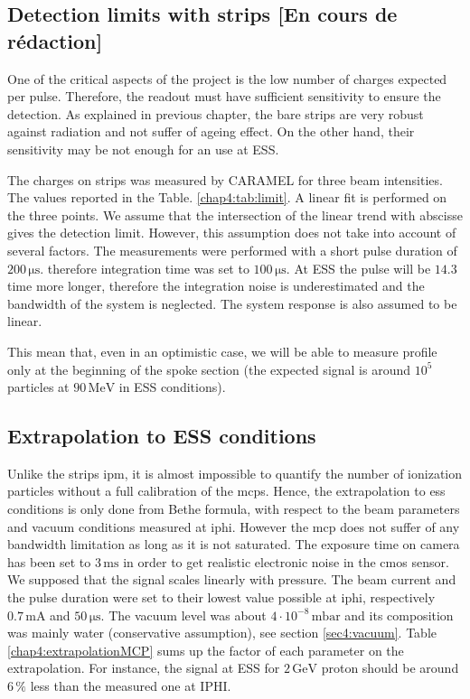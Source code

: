 \begin{refsection}
  \subsection{Detection limits with strips [En cours de rédaction]}
  One of the critical aspects of the project is the low number of charges expected per pulse. Therefore, the  readout must have sufficient sensitivity to ensure the detection. As explained in previous chapter, the bare strips are very robust against radiation and not suffer of ageing effect. On the other hand, their sensitivity may be not enough for an use at ESS.

  The charges on strips was measured by CARAMEL for three beam intensities. The values reported in the Table. \ref{chap4:tab:limit}. A linear fit is performed on the three points. We assume that the intersection of the linear trend with abscisse gives the detection limit. However, this assumption does not take into account of several factors. The measurements were performed with a short pulse duration of $200\,\mathrm{\mu s}$. therefore integration time was set to $100\,\mathrm{\mu s}$. At ESS the pulse will be $14.3$ time more longer, therefore the integration noise is underestimated and the bandwidth of the system is neglected. The system response is also assumed to be linear.

  


  
  This mean that, even in an optimistic case, we will be able to measure profile only at the beginning of the spoke section (the expected signal is around $10^{5}$ particles at $90\,\mathrm{MeV}$ in ESS conditions).

  \subsection{Extrapolation to ESS conditions}
  \label{chap4:sec:MCPess}
  Unlike the strips \acrshort{ipm}, it is almost impossible to quantify the number of ionization particles without a full calibration of the \acrshort{mcp}s. Hence, the extrapolation to \acrshort{ess} conditions is only done from Bethe formula, with respect to the beam parameters and vacuum conditions measured at \acrshort{iphi}.
  However the \acrshort{mcp} does not suffer of any bandwidth limitation as long as it is not saturated. The exposure time on camera has been set to $3\,\mathrm{ms}$ in order to get realistic electronic noise in the \acrshort{cmos} sensor.
  We supposed that the signal scales linearly with pressure. The beam current and the pulse duration were set to their lowest value possible at \acrshort{iphi}, respectively $0.7\,\mathrm{mA}$ and $50\, \mathrm{\mu s}$. The vacuum level was about $4 \cdot 10^{-8}\,\mathrm{mbar}$ and its composition was mainly water (conservative assumption), see section \ref{sec4:vacuum}. Table \ref{chap4:extrapolationMCP} sums up the factor of each parameter on the extrapolation. For instance, the signal at ESS for $2\,\mathrm{GeV}$ proton  should be around $6\,\mathrm{\%}$ less than the measured one at IPHI.
  


\end{refsection}
